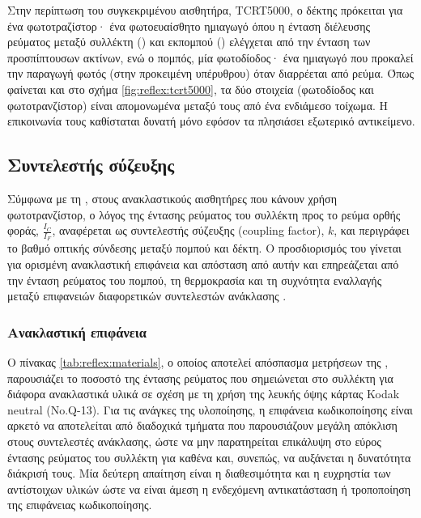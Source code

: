Στην περίπτωση του συγκεκριμένου αισθητήρα, TCRT5000, ο δέκτης πρόκειται για ένα
φωτοτραζίστορ· ένα φωτοευαίσθητο ημιαγωγό όπου η ένταση διέλευσης ρεύματος
μεταξύ συλλέκτη () και εκπομπού () ελέγχεται από την
ένταση των προσπίπτουσων ακτίνων, ενώ ο πομπός, μία φωτοδίοδος· ένα ημιαγωγό που
προκαλεί την παραγωγή φωτός (στην προκειμένη υπέρυθρου) όταν διαρρέεται από
ρεύμα. Όπως φαίνεται και στο σχήμα \ref{fig:reflex:tcrt5000}, τα δύο στοιχεία
(φωτοδίοδος και φωτοτρανζίστορ) είναι απομονωμένα μεταξύ τους από ένα ενδιάμεσο
τοίχωμα. Η επικοινωνία τους καθίσταται δυνατή μόνο εφόσον τα πλησιάσει εξωτερικό
αντικείμενο.


\subsection{Συντελεστής σύζευξης}
\label{subsec:reflex:coupling-factor}

Σύμφωνα με τη \textcite{vishay02}, στους ανακλαστικούς αισθητήρες που κάνουν
χρήση φωτοτρανζίστορ, ο λόγος της έντασης ρεύματος του συλλέκτη προς το ρεύμα
ορθής φοράς, $\frac{I_{C}}{I_{F}}$, αναφέρεται ως συντελεστής σύζευξης
 (coupling factor), $k$, και περιγράφει το
βαθμό οπτικής σύνδεσης μεταξύ πομπού και δέκτη.
Ο προσδιορισμός του γίνεται για ορισμένη ανακλαστική επιφάνεια και απόσταση από
αυτήν και επηρεάζεται από την ένταση ρεύματος του πομπού, τη θερμοκρασία και τη
συχνότητα εναλλαγής μεταξύ επιφανειών διαφορετικών συντελεστών ανάκλασης
\parencite{vishay02}.


\subsubsection{Ανακλαστική επιφάνεια}

Ο πίνακας \ref{tab:reflex:materials}, ο οποίος αποτελεί απόσπασμα μετρήσεων της
\textcite{vishay06},
παρουσιάζει το ποσοστό της έντασης ρεύματος που σημειώνεται στο συλλέκτη για
διάφορα ανακλαστικά υλικά σε σχέση με τη χρήση της λευκής όψης κάρτας Kodak
neutral (No\@.Q-13).
Για τις ανάγκες της υλοποίησης, η επιφάνεια κωδικοποίησης είναι αρκετό να
αποτελείται από διαδοχικά τμήματα που παρουσιάζουν μεγάλη απόκλιση στους
συντελεστές ανάκλασης, ώστε να μην παρατηρείται επικάλυψη στο εύρος έντασης
ρεύματος του συλλέκτη για καθένα και, συνεπώς, να αυξάνεται η δυνατότητα
διάκρισή τους. Μία δεύτερη απαίτηση είναι η διαθεσιμότητα και η ευχρηστία των
αντίστοιχων υλικών ώστε να είναι άμεση η ενδεχόμενη αντικατάσταση ή τροποποίηση
της επιφάνειας κωδικοποίησης.

